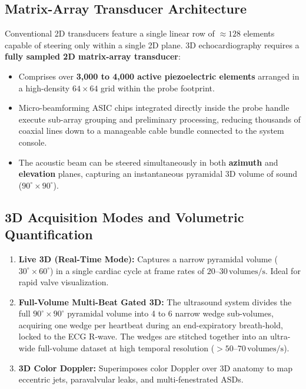 \documentclass[11pt,a4paper]{article}
\begin{document}
\subsection{Matrix-Array Transducer Architecture}

Conventional 2D transducers feature a single linear row of $\approx 128$ elements capable of steering only within a single 2D plane. 3D echocardiography requires a \textbf{fully sampled 2D matrix-array transducer}:
\begin{itemize}[leftmargin=*]
    \item Comprises over \textbf{3,000 to 4,000 active piezoelectric elements} arranged in a high-density $64 \times 64$ grid within the probe footprint.
    \item Micro-beamforming ASIC chips integrated directly inside the probe handle execute sub-array grouping and preliminary processing, reducing thousands of coaxial lines down to a manageable cable bundle connected to the system console.
    \item The acoustic beam can be steered simultaneously in both \textbf{azimuth} and \textbf{elevation} planes, capturing an instantaneous pyramidal 3D volume of sound ($90^\circ \times 90^\circ$).
\end{itemize}

\subsection{3D Acquisition Modes and Volumetric Quantification}

\begin{enumerate}[leftmargin=*]
    \item \textbf{Live 3D (Real-Time Mode):} Captures a narrow pyramidal volume ($30^\circ \times 60^\circ$) in a single cardiac cycle at frame rates of $20\text{--}30\,\text{volumes/s}$. Ideal for rapid valve visualization.
    \item \textbf{Full-Volume Multi-Beat Gated 3D:} The ultrasound system divides the full $90^\circ \times 90^\circ$ pyramidal volume into 4 to 6 narrow wedge sub-volumes, acquiring one wedge per heartbeat during an end-expiratory breath-hold, locked to the ECG R-wave. The wedges are stitched together into an ultra-wide full-volume dataset at high temporal resolution ($> 50\text{--}70\,\text{volumes/s}$).
    \item \textbf{3D Color Doppler:} Superimposes color Doppler over 3D anatomy to map eccentric jets, paravalvular leaks, and multi-fenestrated ASDs.
\end{enumerate}
\end{document}
